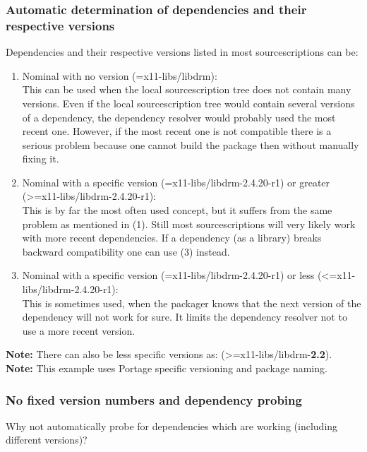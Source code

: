 \documentclass[a4paper,10pt]{article}
\begin{document}
\subsubsection{Automatic determination of dependencies and their respective versions}
Dependencies and their respective versions listed in most sourcescriptions can be:
\begin{enumerate}
\item Nominal with no version (=x11-libs/libdrm):\\
This can be used when the local sourcescription tree does not contain many versions. Even if the local sourcescription tree would contain several versions of a dependency, the dependency resolver would probably used the most recent one. However, if the most recent one is not compatible there is a serious problem because one cannot build the package then without manually fixing it.
\item Nominal with a specific version (=x11-libs/libdrm-2.4.20-r1) or greater (\textgreater=x11-libs/libdrm-2.4.20-r1):\\
This is by far the most often used concept, but it suffers from the same problem as mentioned in (1). Still most sourcescriptions will very likely work with more recent dependencies. If a dependency (as a library) breaks backward compatibility one can use (3) instead.
\item Nominal with a specific version (=x11-libs/libdrm-2.4.20-r1) or less (\textless=x11-libs/libdrm-2.4.20-r1):\\
This is sometimes used, when the packager knows that the next version of the dependency will not work for sure. It limits the dependency resolver not to use a more recent version.
\end{enumerate}
\textbf{Note:} There can also be less specific versions as: (\textgreater=x11-libs/libdrm-\textbf{2.2}).\\

\textbf{Note:} This example uses Portage specific versioning and package naming.

\subsubsection*{No fixed version numbers and dependency probing}
Why not automatically probe for dependencies which are working (including different versions)?\\
\end{document}
